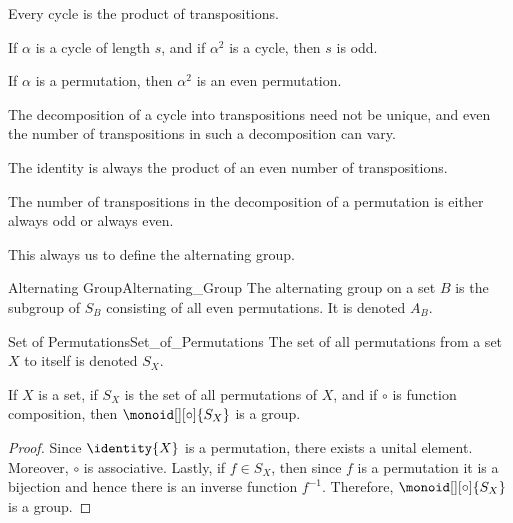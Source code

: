         \begin{theorem}
            Every cycle is the product of transpositions.
        \end{theorem}
        \begin{theorem}
            If $\alpha$ is a cycle of length $s$, and if $\alpha^{2}$ is a
            cycle, then $s$ is odd.
        \end{theorem}
        \begin{theorem}
            If $\alpha$ is a permutation, then $\alpha^{2}$ is an even
            permutation.
        \end{theorem}
        The decomposition of a cycle into transpositions need not be unique, and
        even the number of transpositions in such a decomposition can vary.
        \begin{theorem}
            The identity is always the product of an even number of
            transpositions.
        \end{theorem}
        \begin{theorem}
            The number of transpositions in the decomposition of a permutation
            is either always odd or always even.
        \end{theorem}
        This always us to define the alternating group.
        \begin{fdefinition}{Alternating Group}{Alternating_Group}
            The alternating group on a set $B$ is the subgroup of $S_{B}$
            consisting of all even permutations. It is denoted $A_{B}$.
        \end{fdefinition}
        \begin{fnotation}{Set of Permutations}{Set_of_Permutations}
            The set of all permutations from a set $X$ to itself is denoted
            $S_{X}$.
        \end{fnotation}
        \begin{theorem}
            \label{thm:Symmetric_Group_is_Group}%
            If $X$ is a set, if $S_{X}$ is the set of all permutations of
            $X$, and if $\circ$ is function composition, then
            $\monoid[][\circ]{S_{X}}$ is a group.
        \end{theorem}
        \begin{proof}
            Since $\identity{X}$ is a permutation, there exists a unital
            element. Moreover, $\circ$ is associative. Lastly, if
            $f\in{S}_{X}$, then since $f$ is a permutation it is a bijection
            and hence there is an inverse function $f^{\minus{1}}$.
            Therefore, $\monoid[][\circ]{S_{X}}$ is a group.
        \end{proof}
